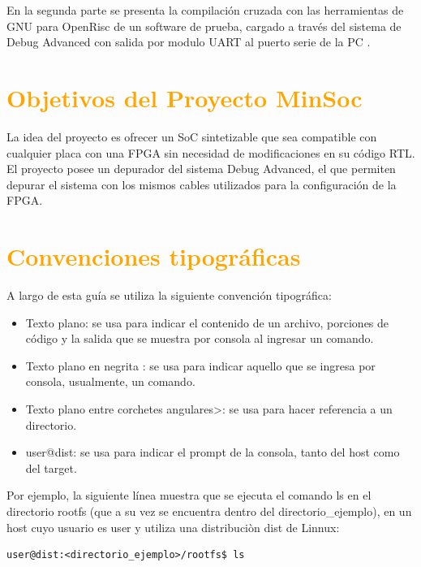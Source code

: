 \documentclass[a4paper,11pt]{article}
\begin{document}
En la segunda parte se presenta la compilación cruzada con las herramientas de GNU para OpenRisc de un software de prueba, cargado a través del sistema de Debug Advanced con salida por modulo UART al puerto serie de la PC .


\newpage
\section{\textcolor{orange}{Objetivos del Proyecto MinSoc}}

La idea del proyecto es ofrecer un SoC sintetizable que sea  compatible con cualquier placa con una FPGA sin necesidad de modificaciones en su código RTL. El proyecto posee un depurador del sistema Debug Advanced,  el que permiten depurar el sistema con los mismos cables utilizados para la configuración de la FPGA. 

\section{\textcolor{orange}{Convenciones tipográficas}}

A largo de esta guía se utiliza la siguiente convención tipográfica: 

\begin{itemize}
\item Texto plano: se usa para indicar el contenido de un archivo, porciones de código y la salida que se muestra por consola al ingresar un comando.
\item Texto plano en negrita : se usa para indicar aquello que se ingresa por consola, usualmente, un comando. 
\item Texto plano entre corchetes angulares>: se usa para hacer referencia a un directorio. 
\item user@dist: se usa para indicar el prompt de la consola, tanto del host como del target. 
\end{itemize} 
 
Por ejemplo, la siguiente línea muestra que se ejecuta el comando ls en el directorio rootfs (que a  su vez se encuentra dentro del directorio\_ejemplo), en un host cuyo usuario es user y utiliza una distribuciòn dist de Linnux:


\begin{verbatim}
user@dist:<directorio_ejemplo>/rootfs$ ls
\end{verbatim}
\end{document}
